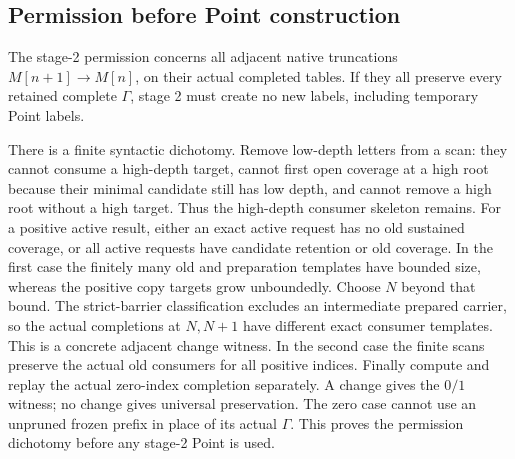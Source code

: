 

\subsection{Permission before Point construction}
The stage-2 permission concerns all adjacent native truncations
$M[n+1]\to M[n]$, on their actual completed tables. If they all
preserve every retained complete $\Gamma$, stage 2 must create no
new labels, including temporary Point labels.

There is a finite syntactic dichotomy. Remove low-depth letters
from a scan: they cannot consume a high-depth target, cannot first
open coverage at a high root because their minimal candidate still
has low depth, and cannot remove a high root without a high target.
Thus the high-depth consumer skeleton remains. For a positive
active result, either an exact active request has no old sustained
coverage, or all active requests have candidate retention or old
coverage. In the first case the finitely many old and preparation
templates have bounded size, whereas the positive copy targets
grow unboundedly. Choose $N$ beyond that bound. The strict-barrier
classification excludes an intermediate prepared carrier, so the
actual completions at $N,N+1$ have different exact consumer
templates. This is a concrete adjacent change witness. In the
second case the finite scans preserve the actual old consumers for
all positive indices. Finally compute and replay the actual
zero-index completion separately. A change gives the $0/1$
witness; no change gives universal preservation. The zero case
cannot use an unpruned frozen prefix in place of its actual $\Gamma$.
This proves the permission dichotomy before any stage-2 Point is used.

